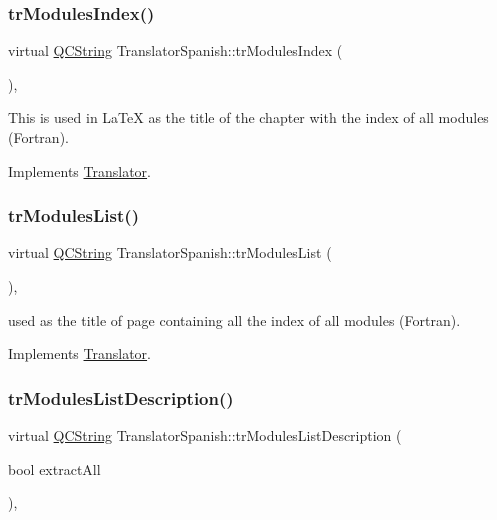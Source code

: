 \subsubsection{\texorpdfstring{trModulesIndex()}{trModulesIndex()}}
{\footnotesize\ttfamily virtual \mbox{\hyperlink{class_q_c_string}{Q\+C\+String}} Translator\+Spanish\+::tr\+Modules\+Index (\begin{DoxyParamCaption}{ }\end{DoxyParamCaption})\hspace{0.3cm}{\ttfamily [inline]}, {\ttfamily [virtual]}}

This is used in La\+TeX as the title of the chapter with the index of all modules (Fortran). 

Implements \mbox{\hyperlink{class_translator}{Translator}}.

\mbox{\label{class_translator_spanish_aafce063c09240a1b825cc9047c5ae34a}} 
\subsubsection{\texorpdfstring{trModulesList()}{trModulesList()}}
{\footnotesize\ttfamily virtual \mbox{\hyperlink{class_q_c_string}{Q\+C\+String}} Translator\+Spanish\+::tr\+Modules\+List (\begin{DoxyParamCaption}{ }\end{DoxyParamCaption})\hspace{0.3cm}{\ttfamily [inline]}, {\ttfamily [virtual]}}

used as the title of page containing all the index of all modules (Fortran). 

Implements \mbox{\hyperlink{class_translator}{Translator}}.

\mbox{\label{class_translator_spanish_a5ab2ac7a04984dc94f31152f1aec849d}} 
\subsubsection{\texorpdfstring{trModulesListDescription()}{trModulesListDescription()}}
{\footnotesize\ttfamily virtual \mbox{\hyperlink{class_q_c_string}{Q\+C\+String}} Translator\+Spanish\+::tr\+Modules\+List\+Description (\begin{DoxyParamCaption}\item[{bool}]{extract\+All }\end{DoxyParamCaption})\hspace{0.3cm}{\ttfamily [inline]}, {\ttfamily [virtual]}}

